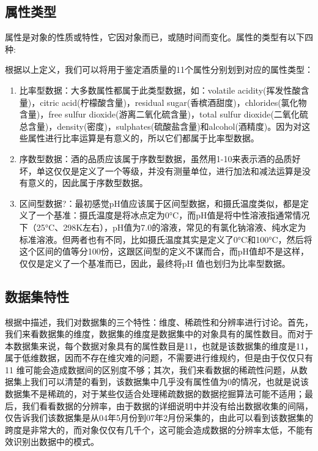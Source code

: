 \documentclass[a4paper, 11pt, hyperref, titlepage]{article}
\newcommand{\hei}[1]{{\HEI #1}}
\begin{document}
\subsection{\hei{属性类型}}

属性是对象的性质或特性，它因对象而已，或随时间而变化。属性的类型有以下四种\cite{FanMing2006}:

\begin{enumerate}
\end{enumerate}
根据以上定义，我们可以将用于鉴定酒质量的11个属性分别划到对应的属性类型：
\begin{enumerate}

    \item 比率型数据：大多数属性都属于此类型数据，如：volatile acidity(挥发性酸含量)，citric acid(柠檬酸含量)，residual sugar(香槟酒甜度)，chlorides(氯化物含量)，free sulfur dioxide(游离二氧化硫含量)，total sulfur dioxide(二氧化硫总含量)，density(密度)，sulphates(硫酸盐含量)和alcohol(酒精度)。因为对这些属性进行比率运算是有意义的，所以它们都属于比率型数据。

    \item 序数型数据：酒的品质应该属于序数型数据，虽然用1-10来表示酒的品质好坏，单这仅仅是定义了一个等级，并没有测量单位，进行加法和减法运算是没有意义的，因此属于序数型数据。

    \item 区间型数据?：最初感觉pH值应该属于区间型数据，和摄氏温度类似，都是定义了一个基准：摄氏温度是将冰点定为0°C，而pH值是将中性溶液指通常情况下（25°C、298K左右），pH值为7.0的溶液，常见的有氯化钠溶液、纯水定为标准溶液。但两者也有不同，比如摄氏温度其实是定义了0°C和100°C，然后将这个区间的值等分100份，这跟区间型的定义不谋而合，而pH值却不是这样，仅仅是定义了一个基准而已，因此，最终将pH 值也划归为比率型数据。

\end{enumerate}

\subsection{\hei{数据集特性}}
根据\cite{FanMing2006}中描述，我们对数据集的三个特性：维度、稀疏性和分辨率进行讨论。首先，我们来看数据集的维度，数据集的维度是数据集中的对象具有的属性数目。而对于本数据集来说，每个数据对象具有的属性数目是11，也就是该数据集的维度是11，属于低维数据，因而不存在维灾难的问题，不需要进行维规约，但是由于仅仅只有11 维可能会造成数据间的区别度不够；其次，我们来看数据的稀疏性问题，从数据集上我们可以清楚的看到，该数据集中几乎没有属性值为0的情况，也就是说该数据集不是稀疏的，对于某些仅适合处理稀疏数据的数据挖掘算法可能不适用；最后，我们看看数据的分辨率，由于数据的详细说明中并没有给出数据收集的间隔，仅告诉我们该数据集是从04年5月份到07年2月份采集的，由此可以看到该数据集的跨度是非常大的，而对象仅仅有几千个，这可能会造成数据的分辨率太低，不能有效识别出数据中的模式。
\end{document}
